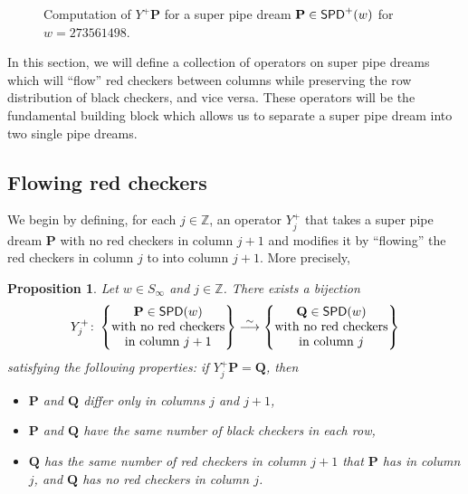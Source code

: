 \documentclass[11pt,reqno]{amsart} %
\makeatletter
\newcommand{\bbZ}{\mathbb{Z}}
\newcommand{\bfP}{\mathbf{P}}
\newcommand{\bfQ}{\mathbf{Q}}
\DeclareMathOperator{\SPD}{\sf{SPD}}
\newenvironment{shift}[1][(0,0)]{
    \begin{scope}[shift={#1}]
}{
    \end{scope}
}
\newtheorem{proposition}[theorem]{Proposition}
\theoremstyle{definition}
\newcommand{\drawSquare}[3][black,opacity=0.5]{
    \draw[#1,thin]
    (#2-0.5,#3+0.5) rectangle (#2+0.5,#3-0.5);
}
\newcommand{\drawGraySquare}[3][gray,opacity=0.3]{
    \filldraw[#1,thin]
    (#2-0.5,#3+0.5) rectangle (#2+0.5,#3-0.5);
}
\newcommand{\checkerradius}{0.38}
\newcommand{\drawXChecker}[2]{
    \fill[color=x color 2] (#1,#2) circle (\checkerradius);
    \fill[
        color=x color 1,
        pattern color=x color 1,
        pattern={Lines[distance=2pt]},
        thick
    ] (#1,#2) circle (\checkerradius);
    \draw[color=x color 1,thick] (#1,#2) circle (\checkerradius);
}
\newcommand{\drawYChecker}[2]{
    \fill[color=y color 2] (#1,#2) circle (\checkerradius);
    \fill[
        color=y color 1,
        pattern color=y color 1,
        pattern={Lines[distance=1.5pt,angle=90]},
    ] (#1,#2) circle (\checkerradius);
    \draw[color=y color 1, thick] (#1,#2) circle (\checkerradius);
}
\newcommand{\drawXYChecker}[2]{
    \drawXChecker{#1}{#2}
    \drawYChecker{#1-0.1}{#2+0.1}
}
\newcommand{\drawRCGraphTile}[3]{

    \ifnum #3=0 \fi %
    \ifnum #3=1 \drawXChecker{#1}{#2} \fi
    \ifnum #3=2 \drawYChecker{#1}{#2} \fi
    \ifnum #3=3 \drawXYChecker{#1}{#2} \fi
    \ifnum #3=4 \drawGraySquare{#1}{#2}\drawXChecker{#1}{#2} \fi
    \ifnum #3=5 \drawGraySquare{#1}{#2}\drawYChecker{#1}{#2} \fi
    \ifnum #3=6 \fi
    \ifnum #3=7 \fi
    \ifnum #3=8 \fi
    \ifnum #3=9 \drawGraySquare{#1}{#2} \fi
}
\newcommand{\drawRCGraph}[3]{
    \PD@i = 1
    \PD@j = 1
    \foreach \t in {#3}{
        \drawRCGraphTile{\number\PD@j}{-\number\PD@i}{\t}
        \drawSquare{\number\PD@j}{-\number\PD@i}
        
        \ifnum\PD@j < \numexpr#2\relax
            \global\advance\PD@j by 1
        \else
            \global\PD@j = 1
            \global\advance\PD@i by 1
        \fi
    }
}
\makeatother
\begin{document}
\begin{figure}

\caption{
    Computation of $Y^+\bfP$ for a super pipe dream $\bfP\in \SPD^+(w)$ for $w = 273561498$.
}
\label{fig:flow example}
\end{figure}

In this section, we will define a collection of operators on super pipe dreams which will ``flow'' red checkers between columns while preserving the row distribution of black checkers, and vice versa.
These operators will be the fundamental building block which allows us to separate a super pipe dream into two single pipe dreams.



\subsection{Flowing red checkers}
\label{subsect:flow definition}

We begin by defining, for each $j\in \bbZ$, an operator $Y^+_j$ that takes a super pipe dream $\bfP$ with no red checkers in column $j+1$ and modifies it by ``flowing'' the red checkers in column $j$ to into column $j+1$.
More precisely,

\begin{proposition}
    Let $w\in S_\infty$ and $j\in \bbZ$.
    There exists a bijection \[
        Y^+_j\colon 
        \left\{\begin{tabular}{@{} c @{}}
            $\bfP\in \SPD(w)$ \\
            with no red checkers \\
            in column $j+1$
        \end{tabular}\right\}
        \overset\sim\longrightarrow
        \left\{\begin{tabular}{@{} c @{}}
            $\bfQ\in \SPD(w)$ \\
            with no red checkers \\
            in column $j$
        \end{tabular}\right\}
    \]
    satisfying the following properties: if $Y^+_j\bfP = \bfQ$, then
    \begin{itemize}
        \item[(i)] $\bfP$ and $\bfQ$ differ only in columns $j$ and $j+1$,
        \item[(ii)] $\bfP$ and $\bfQ$ have the same number of black checkers in each row,
        \item[(iii)] $\bfQ$ has the same number of red checkers in column $j+1$ that $\bfP$ has in column $j$, and $\bfQ$ has no red checkers in column $j$.
    \end{itemize}
\end{proposition}
\end{document}

